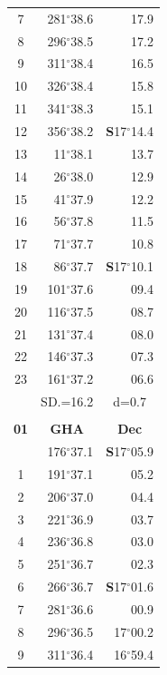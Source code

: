 \documentclass[10pt, a4paper]{report}
\begin{document}
\begin{scriptsize}
\begin{tabular*}{0.2\textwidth}[t]{@{\extracolsep{\fill}}|c|rr|}
7 & 281$^\circ$38.6 & 17.9\\
8 & 296$^\circ$38.5 & 17.2\\
9 & 311$^\circ$38.4 & \raisebox{0.24ex}{\boldmath$\cdot$~\boldmath$\cdot$~~}16.5\\
10 & 326$^\circ$38.4 & 15.8\\
11 & 341$^\circ$38.3 & 15.1\\[2Pt]
12 & 356$^\circ$38.2 & \textbf{S}17$^\circ$14.4\\
13 & 11$^\circ$38.1 & 13.7\\
14 & 26$^\circ$38.0 & 12.9\\
15 & 41$^\circ$37.9 & \raisebox{0.24ex}{\boldmath$\cdot$~\boldmath$\cdot$~~}12.2\\
16 & 56$^\circ$37.8 & 11.5\\
17 & 71$^\circ$37.7 & 10.8\\[2Pt]
18 & 86$^\circ$37.7 & \textbf{S}17$^\circ$10.1\\
19 & 101$^\circ$37.6 & 09.4\\
20 & 116$^\circ$37.5 & 08.7\\
21 & 131$^\circ$37.4 & \raisebox{0.24ex}{\boldmath$\cdot$~\boldmath$\cdot$~~}08.0\\
22 & 146$^\circ$37.3 & 07.3\\
23 & 161$^\circ$37.2 & 06.6\\
\hline
\rule{0pt}{2.4ex} & \multicolumn{1}{c}{SD.=16.2} & \multicolumn{1}{c|}{d=0.7}\\
\hline
\multicolumn{1}{c}{}\\[-0.5ex]\hline
\multicolumn{1}{|c|}{\rule{0pt}{2.6ex}\textbf{01}} & \multicolumn{1}{c}{\textbf{GHA}} & \multicolumn{1}{c|}{\textbf{Dec}}\\
\hline\rule{0pt}{2.6ex}\noindent
0 & 176$^\circ$37.1 & \textbf{S}17$^\circ$05.9\\
1 & 191$^\circ$37.1 & 05.2\\
2 & 206$^\circ$37.0 & 04.4\\
3 & 221$^\circ$36.9 & \raisebox{0.24ex}{\boldmath$\cdot$~\boldmath$\cdot$~~}03.7\\
4 & 236$^\circ$36.8 & 03.0\\
5 & 251$^\circ$36.7 & 02.3\\[2Pt]
6 & 266$^\circ$36.7 & \textbf{S}17$^\circ$01.6\\
7 & 281$^\circ$36.6 & 00.9\\
8 & 296$^\circ$36.5 & 17$^\circ$00.2\\
9 & 311$^\circ$36.4 & 16$^\circ$59.4\\

\end{tabular*}
\end{scriptsize}
\end{document}
